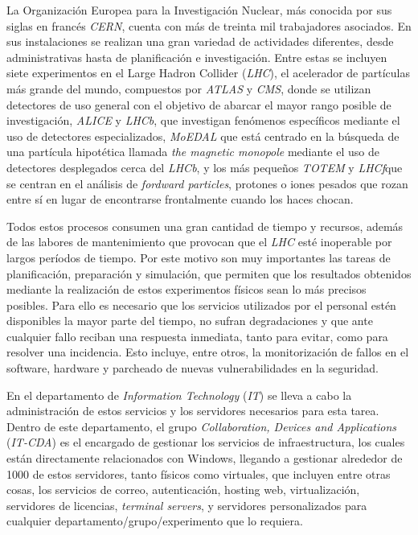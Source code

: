 \label{sec:int}


La Organización Europea para la Investigación Nuclear, más conocida por sus siglas en francés \textit{CERN}, cuenta con más de treinta mil trabajadores asociados. En sus instalaciones se realizan una gran variedad de actividades diferentes, desde administrativas hasta de planificación e investigación. Entre estas se incluyen siete experimentos en el Large Hadron Collider (\textit{LHC}), el acelerador de partículas más grande del mundo, compuestos por \textit{ATLAS} y \textit{CMS}, donde se utilizan detectores de uso general con el objetivo de abarcar el mayor rango posible de investigación, \textit{ALICE} y \textit{LHCb}, que investigan fenómenos específicos mediante el uso de detectores especializados, \textit{MoEDAL} que está centrado en la búsqueda de una partícula hipotética llamada \textit{the magnetic monopole} mediante el uso de detectores desplegados cerca del \textit{LHCb}, y los más pequeños \textit{TOTEM} y \textit{LHCf}que se centran en el análisis de \textit{fordward particles}, protones o iones pesados que rozan entre sí en lugar de encontrarse frontalmente cuando los haces chocan. \cite{lhc}

Todos estos procesos consumen una gran cantidad de tiempo y recursos, además de las labores de mantenimiento que provocan que el \textit{LHC} esté inoperable por largos períodos de tiempo. Por este motivo son muy importantes las tareas de planificación, preparación y simulación, que permiten que los resultados obtenidos mediante la realización de estos experimentos físicos sean lo más precisos posibles. Para ello es necesario que los servicios utilizados por el personal estén disponibles la mayor parte del tiempo, no sufran degradaciones y que ante cualquier fallo reciban una respuesta inmediata, tanto para evitar, como para resolver una incidencia. Esto incluye, entre otros, la monitorización de fallos en el software, hardware y parcheado de nuevas vulnerabilidades en la seguridad.

En el departamento de \textit{Information Technology} (\textit{IT}) se lleva a cabo la administración de estos servicios y los servidores necesarios para esta tarea. Dentro de este departamento, el grupo \textit{Collaboration, Devices and Applications} (\textit{IT-CDA}) es el encargado de gestionar los servicios de infraestructura, los cuales están directamente relacionados con Windows, llegando a gestionar alrededor de 1000 de estos servidores, tanto físicos como virtuales, que incluyen entre otras cosas, los servicios de correo, autenticación, hosting web, virtualización, servidores de licencias, \textit{terminal servers}, y servidores personalizados para cualquier departamento/grupo/experimento que lo requiera. \cite{infraservicios,infrawindows}

